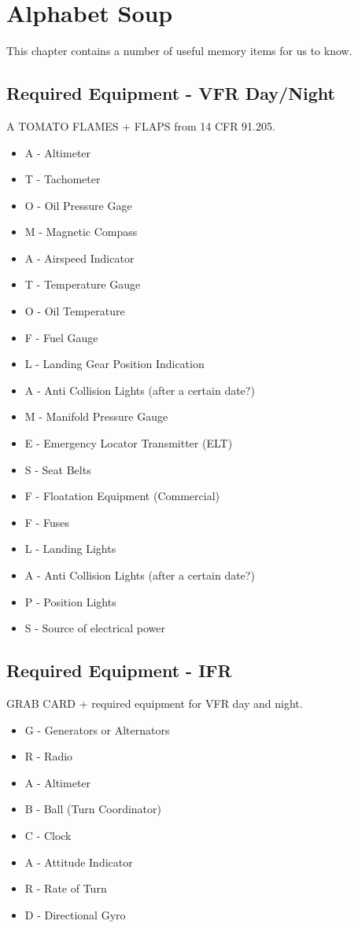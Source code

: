 \chapter{Alphabet Soup}

This chapter contains a number of useful memory items for us to know.

\section{Required Equipment - VFR Day/Night}

A TOMATO FLAMES + FLAPS from 14 CFR 91.205.

\begin{itemize}
\item A - Altimeter
\item T - Tachometer
\item O - Oil Pressure Gage
\item M - Magnetic Compass
\item A - Airspeed Indicator
\item T - Temperature Gauge
\item O - Oil Temperature
\item F - Fuel Gauge
\item L - Landing Gear Position Indication
\item A - Anti Collision Lights (after a certain date?)
\item M - Manifold Pressure Gauge
\item E - Emergency Locator Transmitter (ELT)
\item S - Seat Belts
\item F - Floatation Equipment (Commercial)
\item F - Fuses
\item L - Landing Lights
\item A - Anti Collision Lights (after a certain date?)
\item P - Position Lights
\item S - Source of electrical power
\end{itemize}

\section{Required Equipment - IFR}

GRAB CARD + required equipment for VFR day and night.

\begin{itemize}
\item G - Generators or Alternators
\item R - Radio
\item A - Altimeter
\item B - Ball (Turn Coordinator)
\item C - Clock
\item A - Attitude Indicator
\item R - Rate of Turn
\item D - Directional Gyro
\end{itemize}


